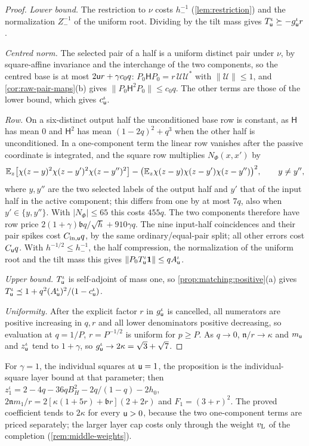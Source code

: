 \begin{proof}
\emph{Lower bound.} The restriction to $\nu$ costs $h_-^{-1}$ (\cref{lem:restriction}) and the
normalization $Z_-^{-1}$ of the uniform root. Dividing by the tilt mass gives $T^\iota_\mathsf u\succeq-g^\iota_\mathsf u r$.

\emph{Centred norm.} The selected pair of a half is a uniform distinct pair under $\nu$, by
square-affine invariance and the interchange of the two components, so the centred base
is at most $2\mathsf u r+\gamma c_0q$: $P_0\mathsf HP_0=r\,\mathcal U\mathcal U^*$ with
$\|\mathcal U\|\le1$, and \cref{cor:raw-pair-maps}(b) gives $\|P_0\mathsf H^2P_0\|\le c_0q$. The other
terms are those of the lower bound, which gives $c^\iota_\mathsf u$.

\emph{Row.} On a six-distinct output half the unconditioned base row is constant, as
$\mathsf H$ has mean $0$ and $\mathsf H^2$ has mean $(1-2q)^2+q^3$ when the other half is
unconditioned. In a one-component term the linear row vanishes
after the passive coordinate is integrated, and the square row multiplies $N_\Phi(x,x')$ by
\[
 \mathbb E_z\bigl[\chi(z-y)^2\chi(z-y')^2\chi(z-y'')^2\bigr]-\bigl(\mathbb E_z\chi(z-y)\chi(z-y')\chi(z-y'')\bigr)^2,
 \qquad y\ne y'',
\]
where $y,y''$ are the two selected labels of the output half and $y'$ that
of the input half in the active component; this differs from one by at
most $7q$, also when $y'\in\{y,y''\}$. With $|N_\Phi|\le65$ this
costs $455q$. The two
components therefore have row price $2(1+\gamma)\mathfrak bq/\sqrt h+910\gamma q$. The nine
input-half coincidences and their pair spikes cost $C_{\rm in,\mathsf u}q$, by the same
ordinary/equal-pair split; all other errors cost $C_\mathsf u q$. With $h^{-1/2}\le h_-^{-1}$, the
half compression, the normalization of the uniform root and the tilt
mass this gives $\|P_0T^\iota_\mathsf u\mathbf 1\|\le qA^\iota_\mathsf u$.

\emph{Upper bound.} $T^\iota_\mathsf u$ is self-adjoint of mass one, so
\cref{prop:matching:positive}(a) gives $T^\iota_\mathsf u\preceq1+q^2(A^\iota_\mathsf u)^2/(1-c^\iota_\mathsf u)$.

\emph{Uniformity.} After the explicit factor $r$ in $g^\iota_\mathsf u$ is cancelled, all numerators
are positive increasing in $q,r$ and all lower denominators positive decreasing, so
evaluation at $q=1/P$, $r=P^{-1/2}$ is uniform for $p\ge P$. As $q\to0$, $\mathfrak n/r\to\kappa$
and $m_\mathsf u$ and $z^\iota_\mathsf u$ tend to $1+\gamma$, so $g^\iota_\mathsf u\to2\kappa=\sqrt3+\sqrt7$.
\end{proof}

For $\gamma=1$, the individual squares at $\mathsf u=1$, the proposition is
the individual-square layer bound at that parameter; then
$z^\iota_1=2-4q-36qB_H^2-2q/(1-q)-2h_0$, $2\mathfrak nm_1/r=2[\kappa(1+5r)+\mathfrak br](2+2r)$
and $F_1=(3+r)^2$. The proved coefficient tends to $2\kappa$ for every $\mathsf u>0$, because the
two one-component terms are priced separately; the larger layer cap costs only through
the weight $v_{\rm L}$ of the completion (\cref{rem:middle-weights}).

